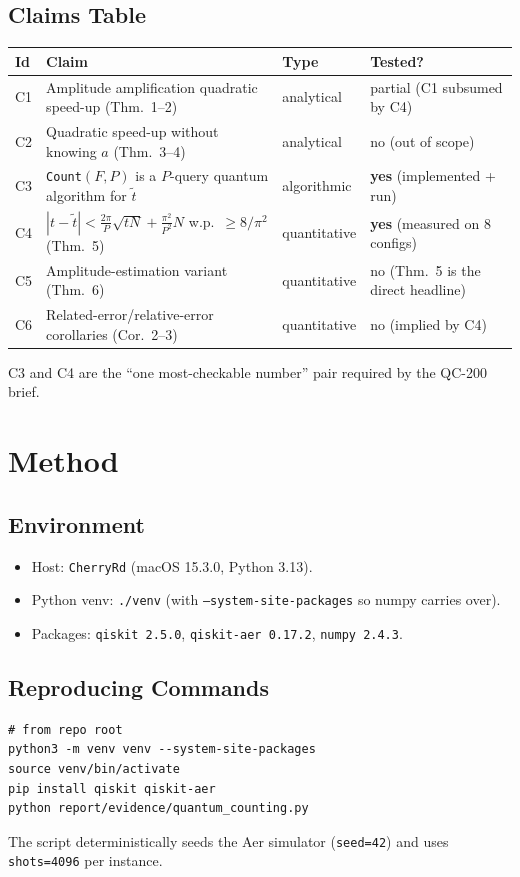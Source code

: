 \documentclass[11pt]{article}
\begin{document}
\subsection{Claims Table}
\begin{center}
\begin{tabular}{@{}llll@{}}
\toprule
Id & Claim & Type & Tested? \\
\midrule
C1 & Amplitude amplification quadratic speed-up (Thm.~1--2) & analytical & partial (C1 subsumed by C4)\\
C2 & Quadratic speed-up without knowing $a$ (Thm.~3--4) & analytical & no (out of scope)\\
C3 & \texttt{Count}$(F,P)$ is a $P$-query quantum algorithm for $\tilde t$ & algorithmic & \textbf{yes} (implemented + run)\\
C4 & $|t-\tilde t| < \frac{2\pi}{P}\sqrt{tN} + \frac{\pi^2}{P^2}N$ w.p.\ $\geq 8/\pi^2$ (Thm.~5) & quantitative & \textbf{yes} (measured on 8 configs)\\
C5 & Amplitude-estimation variant (Thm.~6) & quantitative & no (Thm.~5 is the direct headline)\\
C6 & Related-error/relative-error corollaries (Cor.~2--3) & quantitative & no (implied by C4)\\
\bottomrule
\end{tabular}
\end{center}
C3 and C4 are the ``one most-checkable number'' pair required by the
QC-200 brief.

\section{Method}
\subsection{Environment}
\begin{itemize}
\item Host: \texttt{CherryRd} (macOS 15.3.0, Python 3.13).
\item Python venv: \texttt{./venv} (with \texttt{--system-site-packages} so numpy carries over).
\item Packages: \texttt{qiskit 2.5.0}, \texttt{qiskit-aer 0.17.2}, \texttt{numpy 2.4.3}.
\end{itemize}

\subsection{Reproducing Commands}
\begin{lstlisting}
# from repo root
python3 -m venv venv --system-site-packages
source venv/bin/activate
pip install qiskit qiskit-aer
python report/evidence/quantum_counting.py
\end{lstlisting}
The script deterministically seeds the Aer simulator (\texttt{seed=42}) and
uses \texttt{shots=4096} per instance.
\end{document}
